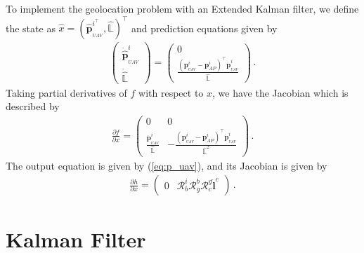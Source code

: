To implement the geolocation problem with an Extended Kalman filter, we define the state as $\hat{x}=(\hat{\boldsymbol{p}}_{_{UAV}}^{i^\top},\hat{\mathbb{L}})^\top$ and prediction equations given by
\begin{align*}
\begin{pmatrix}
\dot{\hat{\boldsymbol{p}}}_{_{UAV}}^i \\
\dot{\hat{\mathbb{L}}}
\end{pmatrix}
=
\begin{pmatrix}
0 \\
\frac{(\boldsymbol{p}_{_{UAV}}^i-\boldsymbol{p}_{AP}^i)^\top\dot{\boldsymbol{p}}_{_{UAV}}^i}{\hat{\mathbb{L}}}
\end{pmatrix}\,.
\end{align*}
Taking partial derivatives of $f$ with respect to $x$, we have the Jacobian which is described by
\begin{align*}
\frac{\partial f}{\partial x}=
\begin{pmatrix}
0 & 0 \\
\frac{\dot{\boldsymbol{p}}_{_{UAV}}^i}{\hat{\mathbb{L}}} & -\frac{(\boldsymbol{p}_{_{UAV}}^i-\boldsymbol{p}_{AP}^i)^\top\dot{\boldsymbol{p}}_{_{UAV}}^i}{\hat{\mathbb{L}}^2}
\end{pmatrix}\,.
\end{align*}
The output equation is given by (\ref{eq:p_uav}), and its Jacobian is given by
\begin{align*}
\frac{\partial h}{\partial x}=
\begin{pmatrix}
0 & \mathcal{R}_b^i\mathcal{R}_g^b\mathcal{R}_c^g\check{\boldsymbol{l}}^c
\end{pmatrix}\,.
\end{align*}

\pagebreak
\section{Kalman Filter}{\label{sect:kalman_filter}}

